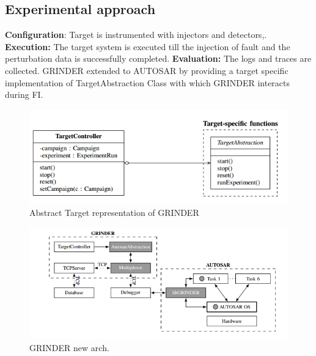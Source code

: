 
\subsection{Experimental approach} %
\textbf{Configuration}: Target is instrumented with injectors and detectors,.
\textbf{Execution:} The target system is executed till the injection of fault and the perturbation data is successfully completed.
\textbf{Evaluation:} The logs and traces are collected.
GRINDER extended to AUTOSAR by providing a target specific implementation of TargetAbstraction Class with which GRINDER interacts during FI.

\begin{figure}
\begin{center}
	\centering
	\includegraphics[width=400pt]{Pictures/Grinder_Extension}
	\caption{Abstract Target representation of GRINDER}
\end{center}
\end{figure}

\begin{figure}[H]
	\centering
	\includegraphics[width=400pt]{Pictures/GRINDER_Arch}
	\caption{GRINDER new arch.}\label{visina8}
\end{figure}

